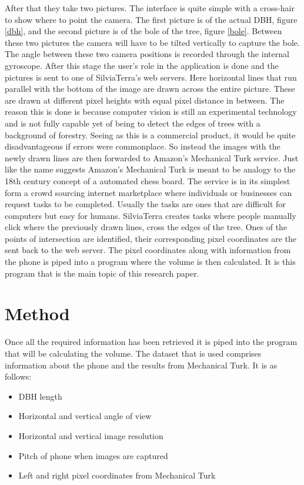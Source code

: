 After that they take two pictures. The interface is quite simple with a 
cross-hair to show where to point the camera. The first picture is of the 
actual DBH, figure \ref{dbh}, and the second picture is of the bole of the tree, 
figure \ref{bole}. Between these two pictures the camera will have to be tilted 
vertically to capture the bole. The angle between these two camera positions is 
recorded through the internal gyroscope. After this stage the user's role in 
the application is done and the pictures is sent to one of SilviaTerra's web 
servers. Here horizontal lines that run parallel with the bottom of the image 
are drawn across the entire picture. These are drawn at different pixel heights 
with equal pixel distance in between. The reason this is done is because 
computer vision is still an experimental technology and is not fully capable 
yet of being to detect the edges of trees with a background of forestry. 
Seeing as this is a commercial product, it would be quite disadvantageous if 
errors were commonplace. So instead the images with the newly drawn lines are 
then forwarded to Amazon's Mechanical Turk service. Just like the name suggests 
Amazon's Mechanical Turk is meant to be analogy to the 18th century concept of 
a automated chess board. The service is in its simplest form a crowd sourcing 
internet marketplace where individuals or businesses can request tasks to be 
completed. Usually the tasks are ones that are difficult for computers but 
easy for humans. SilviaTerra creates tasks where people manually click where 
the previously drawn lines, cross the edges of the tree. Ones of the points of 
intersection are identified, their corresponding pixel coordinates are the sent 
back to the web server. The pixel coordinates along with information from the 
phone is piped into a program where the volume is then calculated. It is this 
program that is the main topic of this research paper.

\section{Method}
Once all the required information has been retrieved it is piped into the 
program that will be calculating the volume. The dataset that is used comprises 
information about the phone and the results from Mechanical Turk. It is as follows:
\begin{itemize}
	\item DBH length
	\item Horizontal and vertical angle of view
	\item Horizontal and vertical image resolution
	\item Pitch of phone when images are captured
	\item Left and right pixel coordinates from Mechanical Turk
\end{itemize}

